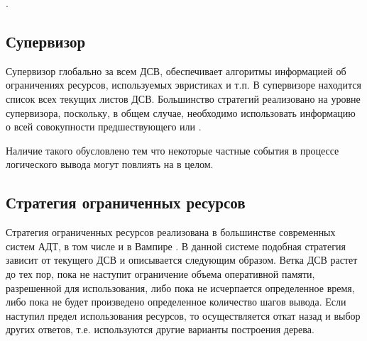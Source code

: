 .


\subsection{Супервизор}
Супервизор  глобально за всем ДСВ, обеспечивает алгоритмы информацией об ограничениях ресурсов, используемых эвристиках и т.п. В супервизоре находится список всех текущих листов ДСВ. Большинство стратегий реализовано на уровне супервизора, поскольку, в общем случае, необходимо использовать информацию о всей совокупности предшествующего или .

Наличие такого  обусловлено тем что некоторые частные события в процессе логического вывода могут повлиять на  в целом.

\subsection{Стратегия ограниченных ресурсов}
Стратегия ограниченных ресурсов реализована в большинстве современных систем АДТ, в том числе и в Вампире \cite{}. В данной системе подобная стратегия  зависит от текущего ДСВ и описывается следующим образом. Ветка ДСВ растет до тех пор, пока не наступит ограничение объема оперативной памяти, разрешенной для использования, либо пока не исчерпается определенное время, либо пока не будет произведено определенное количество шагов вывода. Если наступил предел использования ресурсов, то осуществляется откат назад и выбор других ответов, т.е. используются другие варианты построения дерева.

